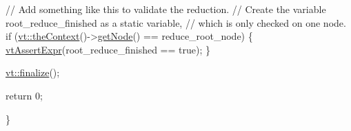 \begin{DoxyCodeInclude}
  \textcolor{comment}{// Add something like this to validate the reduction.}
  \textcolor{comment}{// Create the variable root\_reduce\_finished as a static variable,}
  \textcolor{comment}{// which is only checked on one node.}
  \textcolor{keywordflow}{if} (\hyperlink{namespacevt_a26551fe0e6e6a1371111df5b12c7e92c}{vt::theContext}()->\hyperlink{structvt_1_1ctx_1_1_context_a0d52c263ce8516546a67443d9a86fa5f}{getNode}() == reduce\_root\_node) \{
    \hyperlink{config__assert_8h_a60b04695e9ed43131da50386a2ced779}{vtAssertExpr}(root\_reduce\_finished == \textcolor{keyword}{true});
  \}

  \hyperlink{namespacevt_a540d90dbd6e97b69f1dcbc9ee9314cff}{vt::finalize}();

  \textcolor{keywordflow}{return} 0;

\}
\end{DoxyCodeInclude}
